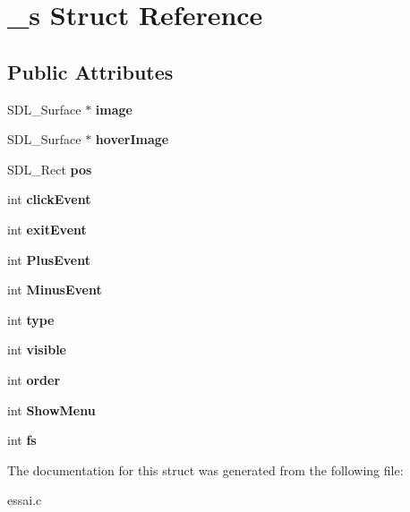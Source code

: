\hypertarget{struct__s}{}\section{\+\_\+s Struct Reference}
\label{struct__s}
\subsection*{Public Attributes}
\begin{DoxyCompactItemize}
\item 
\mbox{\label{struct__s_aaa38d6fbe6c3d583bebcc684973a72e8}} 
S\+D\+L\+\_\+\+Surface $\ast$ {\bfseries image}
\item 
\mbox{\label{struct__s_ab338d600e8063958da44ebe6164e7e73}} 
S\+D\+L\+\_\+\+Surface $\ast$ {\bfseries hover\+Image}
\item 
\mbox{\label{struct__s_aae575cf839d845f6d37d839df8a24048}} 
S\+D\+L\+\_\+\+Rect {\bfseries pos}
\item 
\mbox{\label{struct__s_a3b2f7fbe349639191bda564f2ab9c417}} 
int {\bfseries click\+Event}
\item 
\mbox{\label{struct__s_a8f32f1532e2c279e142503ef681e3a33}} 
int {\bfseries exit\+Event}
\item 
\mbox{\label{struct__s_a994056f600cd06ccc1ec276e8945c7ca}} 
int {\bfseries Plus\+Event}
\item 
\mbox{\label{struct__s_a653d4209db1fe3c4c9c01f466e92761f}} 
int {\bfseries Minus\+Event}
\item 
\mbox{\label{struct__s_a7debdb2cf7176becb9190daef57815d1}} 
int {\bfseries type}
\item 
\mbox{\label{struct__s_a68b2025860966acc7d2114084adb2839}} 
int {\bfseries visible}
\item 
\mbox{\label{struct__s_a36cb04da3dd76fb108404b62c9761ceb}} 
int {\bfseries order}
\item 
\mbox{\label{struct__s_a9b5e0637217eea76dc2b70e0bb8243b5}} 
int {\bfseries Show\+Menu}
\item 
\mbox{\label{struct__s_ac8070e294c2f95844404beba17e5d2de}} 
int {\bfseries fs}
\end{DoxyCompactItemize}


The documentation for this struct was generated from the following file\+:\begin{DoxyCompactItemize}
\item 
essai.\+c\end{DoxyCompactItemize}
